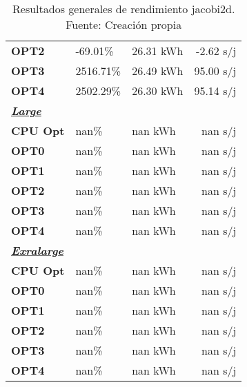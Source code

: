 \begin{table}[H]
\begin{tabular}{lllr}
    \cellcolor[HTML]{DAE8FC} \textbf{OPT2} & -69.01\%  &	26.31 kWh  &	-2.62 s/j \\
    \rowcolor[HTML]{EFEFEF} \cellcolor[HTML]{DAE8FC} \textbf{OPT3} &2516.71\%  &	26.49 kWh  &	95.00 s/j \\
    \cellcolor[HTML]{DAE8FC} \textbf{OPT4} & 2502.29\%  &	26.30 kWh  &	95.14 s/j \\
    \rowcolor[HTML]{EFEFEF} \cellcolor[HTML]{DAE8FC} \textbf{\textbf{{\emph{{\underline{{Large}}}}}}} &&	&	 \\
    \cellcolor[HTML]{DAE8FC} \textbf{CPU Opt} & nan\%  &	nan kWh  &	nan s/j \\
    \rowcolor[HTML]{EFEFEF} \cellcolor[HTML]{DAE8FC} \textbf{OPT0} &nan\%  &	nan kWh  &	nan s/j \\
    \cellcolor[HTML]{DAE8FC} \textbf{OPT1} & nan\%  &	nan kWh  &	nan s/j \\
    \rowcolor[HTML]{EFEFEF} \cellcolor[HTML]{DAE8FC} \textbf{OPT2} &nan\%  &	nan kWh  &	nan s/j \\
    \cellcolor[HTML]{DAE8FC} \textbf{OPT3} & nan\%  &	nan kWh  &	nan s/j \\
    \rowcolor[HTML]{EFEFEF} \cellcolor[HTML]{DAE8FC} \textbf{OPT4} &nan\%  &	nan kWh  &	nan s/j \\
    \cellcolor[HTML]{DAE8FC} \textbf{\textbf{{\emph{{\underline{{Exralarge}}}}}}} & &	&	 \\
    \rowcolor[HTML]{EFEFEF} \cellcolor[HTML]{DAE8FC} \textbf{CPU Opt} &nan\%  &	nan kWh  &	nan s/j \\
    \cellcolor[HTML]{DAE8FC} \textbf{OPT0} & nan\%  &	nan kWh  &	nan s/j \\
    \rowcolor[HTML]{EFEFEF} \cellcolor[HTML]{DAE8FC} \textbf{OPT1} &nan\%  &	nan kWh  &	nan s/j \\
    \cellcolor[HTML]{DAE8FC} \textbf{OPT2} & nan\%  &	nan kWh  &	nan s/j \\
    \rowcolor[HTML]{EFEFEF} \cellcolor[HTML]{DAE8FC} \textbf{OPT3} &nan\%  &	nan kWh  &	nan s/j \\
    \cellcolor[HTML]{DAE8FC} \textbf{OPT4} & nan\%  &	nan kWh  &	nan s/j \\
    \end{tabular}
    \caption[Resultados generales de rendimiento jacobi2d]{{Resultados generales de rendimiento jacobi2d. Fuente: Creación propia}}
    \label{table_global_jacobi2d_PowerResults_speedup-energy}
\end{table}